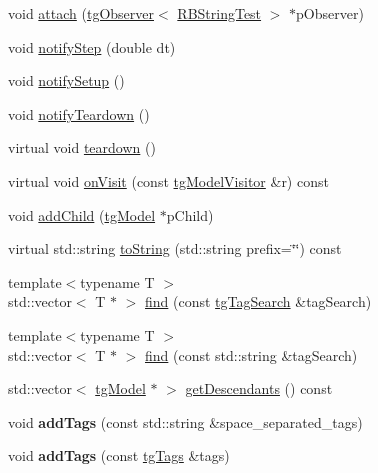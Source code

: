 \begin{DoxyCompactItemize}
\item 
void \hyperlink{classtg_subject_a56ecfd33a048c3a7f1a884318d9af548}{attach} (\hyperlink{classtg_observer}{tg\-Observer}$<$ \hyperlink{class_r_b_string_test}{R\-B\-String\-Test} $>$ $\ast$p\-Observer)
\item 
void \hyperlink{classtg_subject_ad9640aa7fcc1e0b4ce8a913a4ce1ea42}{notify\-Step} (double dt)
\item 
void \hyperlink{classtg_subject_a80799e5d0c8512d3d05a55764790392b}{notify\-Setup} ()
\item 
void \hyperlink{classtg_subject_adf7a60dbb0faf0de5528f862e7953e63}{notify\-Teardown} ()
\item 
virtual void \hyperlink{classtg_model_adb5eec1dcf70a8c039850aea144dcc7e}{teardown} ()
\item 
virtual void \hyperlink{classtg_model_aee6457e0fc54d5570b87bfc779f9b1c0}{on\-Visit} (const \hyperlink{classtg_model_visitor}{tg\-Model\-Visitor} \&r) const 
\item 
void \hyperlink{classtg_model_a292c17848b96caee32b2286e44c13f2f}{add\-Child} (\hyperlink{classtg_model}{tg\-Model} $\ast$p\-Child)
\item 
virtual std\-::string \hyperlink{classtg_model_af37b0c1a6d4060bfe0bb9b5038a17725}{to\-String} (std\-::string prefix=\char`\"{}\char`\"{}) const 
\item 
{\footnotesize template$<$typename T $>$ }\\std\-::vector$<$ T $\ast$ $>$ \hyperlink{classtg_model_ab75836fdfbd9200f165c3b28a19630c0}{find} (const \hyperlink{classtg_tag_search}{tg\-Tag\-Search} \&tag\-Search)
\item 
{\footnotesize template$<$typename T $>$ }\\std\-::vector$<$ T $\ast$ $>$ \hyperlink{classtg_model_aa40b5fb32f8941e04d537f4e6c6db35c}{find} (const std\-::string \&tag\-Search)
\item 
std\-::vector$<$ \hyperlink{classtg_model}{tg\-Model} $\ast$ $>$ \hyperlink{classtg_model_a2efa4321fa5c77b4ce23b01f6fd3a1c4}{get\-Descendants} () const 
\item 
\hypertarget{classtg_taggable_af0b8f1729653b0b90d2fecbd51163612}{void {\bfseries add\-Tags} (const std\-::string \&space\-\_\-separated\-\_\-tags)}\label{classtg_taggable_af0b8f1729653b0b90d2fecbd51163612}

\item 
\hypertarget{classtg_taggable_af28e3fe1a7e4eb28772dc006d575dd1f}{void {\bfseries add\-Tags} (const \hyperlink{classtg_tags}{tg\-Tags} \&tags)}\label{classtg_taggable_af28e3fe1a7e4eb28772dc006d575dd1f}


\end{DoxyCompactItemize}
